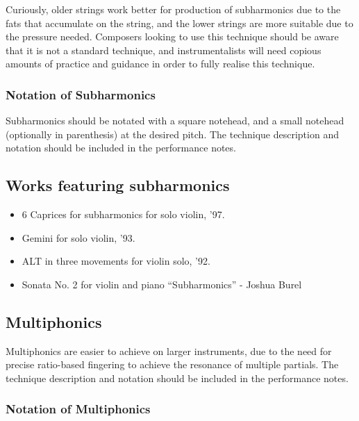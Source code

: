     Curiously, older strings work better for production of subharmonics due to the fats that accumulate on the string, and the lower strings are more suitable due to the pressure needed.\autocite{kimuraHowProduceSubharmonics1999}
Composers looking to use this technique should be aware that it is not a standard technique, and instrumentalists will need copious amounts of practice and guidance in order to fully realise this technique.

\subsubsection{Notation of Subharmonics}
Subharmonics should be notated with a square notehead, and a small notehead (optionally in parenthesis) at the desired pitch.
The technique description and notation should be included in the performance notes.

\subsection{Works featuring subharmonics}

\begin{itemize}

    \item 6 Caprices for subharmonics for solo violin, '97.

    \item Gemini for solo violin, '93.

    \item ALT in three movements for violin solo, '92.

    \item Sonata No. 2 for violin and piano “Subharmonics” - Joshua Burel

\end{itemize}

\subsection{Multiphonics}
Multiphonics are easier to achieve on larger instruments, due to the need for precise ratio-based fingering to achieve the resonance of multiple partials.
The technique description and notation should be included in the performance notes.
\lipsum[4]

\subsubsection{Notation of Multiphonics}

